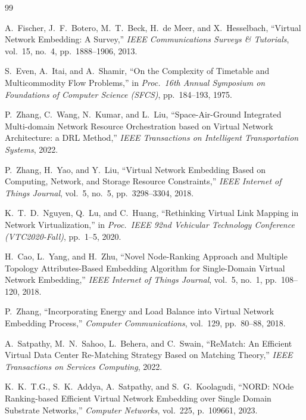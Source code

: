 \documentclass[12pt,a4paper]{report}
\begin{document}
\begin{thebibliography}{99}

A.\ Fischer, J.\ F.\ Botero, M.\ T.\ Beck, H.\ de Meer, and X.\ Hesselbach,
``Virtual Network Embedding: A Survey,''
\textit{IEEE Communications Surveys \& Tutorials},
vol.~15, no.~4, pp.~1888--1906, 2013.

S.\ Even, A.\ Itai, and A.\ Shamir,
``On the Complexity of Timetable and Multicommodity Flow Problems,''
in \textit{Proc.\ 16th Annual Symposium on Foundations of Computer Science (SFCS)},
pp.~184--193, 1975.

P.\ Zhang, C.\ Wang, N.\ Kumar, and L.\ Liu,
``Space-Air-Ground Integrated Multi-domain Network Resource Orchestration based on
Virtual Network Architecture: a DRL Method,''
\textit{IEEE Transactions on Intelligent Transportation Systems},
2022.

P.\ Zhang, H.\ Yao, and Y.\ Liu,
``Virtual Network Embedding Based on Computing, Network, and Storage Resource
Constraints,''
\textit{IEEE Internet of Things Journal},
vol.~5, no.~5, pp.~3298--3304, 2018.

K.\ T.\ D.\ Nguyen, Q.\ Lu, and C.\ Huang,
``Rethinking Virtual Link Mapping in Network Virtualization,''
in \textit{Proc.\ IEEE 92nd Vehicular Technology Conference (VTC2020-Fall)},
pp.~1--5, 2020.

H.\ Cao, L.\ Yang, and H.\ Zhu,
``Novel Node-Ranking Approach and Multiple Topology Attributes-Based Embedding Algorithm
for Single-Domain Virtual Network Embedding,''
\textit{IEEE Internet of Things Journal},
vol.~5, no.~1, pp.~108--120, 2018.

P.\ Zhang,
``Incorporating Energy and Load Balance into Virtual Network Embedding Process,''
\textit{Computer Communications},
vol.~129, pp.~80--88, 2018.

A.\ Satpathy, M.\ N.\ Sahoo, L.\ Behera, and C.\ Swain,
``ReMatch: An Efficient Virtual Data Center Re-Matching Strategy Based on Matching Theory,''
\textit{IEEE Transactions on Services Computing},
2022.

K.\ K.\ T.G., S.\ K.\ Addya, A.\ Satpathy, and S.\ G.\ Koolagudi,
``NORD: NOde Ranking-based Efficient Virtual Network Embedding over Single Domain
Substrate Networks,''
\textit{Computer Networks},
vol.~225, p.~109661, 2023.


\end{thebibliography}
\end{document}
